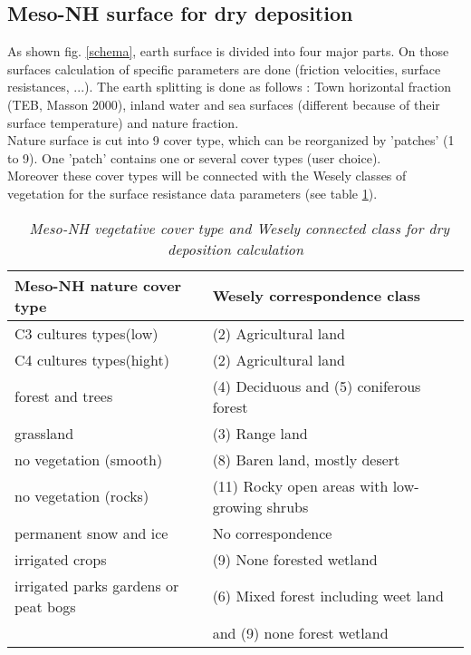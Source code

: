 \subsection{Meso-NH surface for dry deposition}
As shown fig. \ref{schema}, earth surface is divided into four major
parts. On those surfaces calculation of specific parameters are done
(friction velocities, surface resistances, ...). The earth splitting
is done as follows : Town horizontal fraction (TEB, Masson 2000), inland
water and sea surfaces (different because of their surface
temperature) and nature fraction. \\
Nature surface is cut into 9 cover type, which can be reorganized by
'patches' (1 to 9). One 'patch' contains one or several cover types (user
choice). \\
Moreover these cover types will be connected with the Wesely classes of
vegetation for the surface resistance data parameters (see table
\ref{classveg}).
\begin{table}
\begin{center}
\begin{tabular}{|l|l|} \hline
\bf{Meso-NH nature cover type} & \bf{Wesely correspondence class} \\ \hline 
 C3 cultures types(low) &       (2) Agricultural land \\ 
 C4 cultures types(hight)&      (2) Agricultural land \\ 
 forest and trees       &       (4) Deciduous and (5) coniferous
 forest \\ 
 grassland              &       (3) Range land \\ 
 no vegetation (smooth) &       (8) Baren land, mostly desert \\  
 no vegetation (rocks)  &       (11) Rocky open areas with low-growing
 shrubs \\ 
 permanent snow and ice &        No correspondence \\ 
 irrigated crops        &       (9) None forested wetland \\ 
 irrigated parks gardens or peat bogs   & (6) Mixed forest including
 weet land\\
                        &                  and (9) none forest wetland \\ 
\hline
\end{tabular}
\caption{\sl ~{Meso-NH vegetative cover type and Wesely connected
class for dry deposition calculation}}
\label{classveg}
\end{center}
\end{table}

